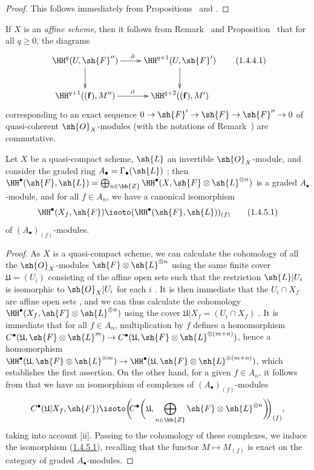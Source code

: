 \begin{proof}
This follows immediately from Propositions~ and .
\end{proof}

\begin{env}[1.4.4]
\label{III.1.4.4}
If $X$ is an \emph{affine scheme}, then it follows from Remark~ and Proposition~ that for all $q\geq 0$, the diagrams
\[
  \xymatrix{
    \HH^q(U,\sh{F}'')\ar[r]^\partial\ar[d] &
    \HH^{q+1}(U,\sh{F}')\ar[d]\\
    \HH^{q+1}((\mathbf{f}),M'')\ar[r]^\partial &
    \HH^{q+2}((\mathbf{f}),M')
  }
  \tag{1.4.4.1}
\]
corresponding to an exact sequence $0\to\sh{F}'\to\sh{F}\to\sh{F}''\to 0$ of quasi-coherent $\sh{O}_X$-modules (with the notations of Remark~) are commutative.
\end{env}

\begin{proposition}[1.4.5]
\label{III.1.4.5}
Let $X$ be a quasi-compact scheme, $\sh{L}$ an invertible $\sh{O}_X$-module, and consider the graded ring $A_\bullet=\Gamma_\bullet(\sh{L})$ ; then $\HH^\bullet(\sh{F},\sh{L})=\bigoplus_{n\in\bb{Z}}\HH^\bullet(X,\sh{F}\otimes\sh{L}^{\otimes n})$ is a graded $A_\bullet$-module, and for all $f\in A_n$, we have a canonical isomorphism
\[
  \HH^\bullet(X_f,\sh{F})\isoto(\HH^\bullet(\sh{F},\sh{L}))_{(f)}
  \tag{1.4.5.1}\label{III.1.4.5.1}
\]
of $(A_\bullet)_{(f)}$-modules.
\end{proposition}

\begin{proof}
As $X$ is a quasi-compact scheme, we can calculate the cohomology of all the $\sh{O}_X$-modules $\sh{F}\otimes\sh{L}^{\otimes n}$ using the same finite cover $\mathfrak{U}=(U_i)$ consisting of the affine open sets such that the restriction $\sh{L}|U_i$ is isomorphic to $\sh{O}_X|U_i$ for each $i$ .
It is then immediate that the $U_i\cap X_f$ are affine open sets , and we can thus calculate the cohomology $\HH^\bullet(X_f,\sh{F}\otimes\sh{L}^{\otimes n})$ using the cover $\mathfrak{U}|X_f=(U_i\cap X_f)$ .
It is immediate that for all $f\in A_n$, multiplication by $f$ defines a homomorphism $C^\bullet(\mathfrak{U},\sh{F}\otimes\sh{L}^m)\to C^\bullet(\mathfrak{U},\sh{F}\otimes\sh{L}^{\otimes(m+n)})$, hence a homomorphism $\HH^\bullet(\mathfrak{U},\sh{F}\otimes\sh{L}^{\otimes m})\to\HH^\bullet(\mathfrak{U},\sh{F}\otimes\sh{L}^{\otimes(m+n)})$, which establishes the first assertion.
On the other hand, for a given $f\in A_n$, it follows from  that we have an isomorphism of complexes of $(A_\bullet)_{(f)}$-modules
\[
  C^\bullet(\mathfrak{U}|X_f,\sh{F})\isoto\bigg(\!\!C^\bullet\bigg(\mathfrak{U},\bigoplus_{n\in\bb{Z}}\sh{F}\otimes\sh{L}^{\otimes n}\bigg)\!\!\bigg)_{(f)},
\]
taking into account [ii].
Passing to the cohomology of these complexes, we induce the isomorphism (\hyperref[III.1.4.5.1]{1.4.5.1}), recalling that the functor $M\mapsto M_{(f)}$ is exact on the category of graded $A_\bullet$-modules.
\end{proof}

